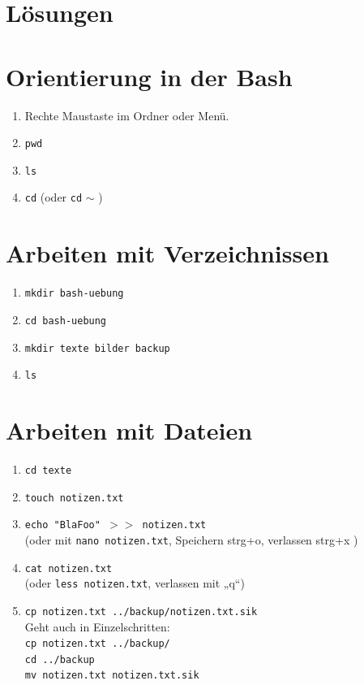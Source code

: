 \documentclass[a4paper,11pt]{article}
\newcommand{\cmd}[1]{\texttt{#1}}
\begin{document}
\newpage

\section*{Lösungen}

\setcounter{section}{1}

\section{Orientierung in der Bash}
\begin{enumerate}[label=\arabic*.]
  \item Rechte Maustaste im Ordner oder Menü.
  \item \cmd {pwd}
  \item \cmd {ls}
  \item \cmd {cd}  (oder \cmd {cd} $\sim$ ) 
\end{enumerate}


\section{Arbeiten mit Verzeichnissen}
\begin{enumerate}[label=\arabic*.]
  \item \cmd {mkdir bash-uebung}
  \item \cmd {cd bash-uebung}
  \item \cmd {mkdir texte bilder backup}
  \item \cmd {ls}
\end{enumerate}


\section{Arbeiten mit Dateien}
\begin{enumerate}[label=\arabic*.]
  \item \cmd {cd texte}
  \item \cmd {touch notizen.txt}
  \item \cmd {echo "BlaFoo" $>>$ notizen.txt} \\ 
        (oder mit \cmd {nano notizen.txt}, Speichern strg+o, verlassen strg+x ) 
  \item \cmd {cat notizen.txt} \\
  (oder \cmd {less notizen.txt}, verlassen mit „q“)
  \item \cmd {cp notizen.txt ../backup/notizen.txt.sik} \\[-0.2cm]
  
  Geht auch in Einzelschritten: \\
  \cmd {cp notizen.txt ../backup/} \\
  \cmd {cd ../backup} \\ 
  \cmd {mv notizen.txt notizen.txt.sik}
\end{enumerate}
\end{document}

